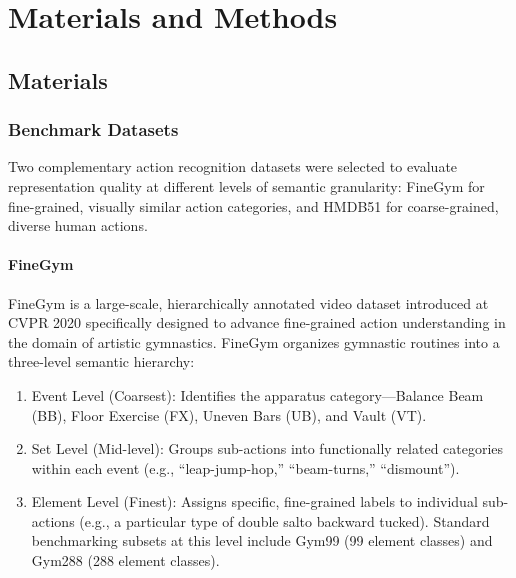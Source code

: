 \chapter{Materials and Methods}

\section{Materials}

\subsection{Benchmark Datasets}

Two complementary action recognition datasets were selected to evaluate representation quality at different levels of semantic granularity: FineGym for fine-grained, visually similar action categories, and HMDB51 for coarse-grained, diverse human actions.

\subsubsection{FineGym}

FineGym \citep{shao2020finegym} is a large-scale, hierarchically annotated video dataset introduced at CVPR 2020 specifically designed to advance fine-grained action understanding in the domain of artistic gymnastics. FineGym organizes gymnastic routines into a three-level semantic hierarchy:

\begin{enumerate}[leftmargin=*]
    \item Event Level (Coarsest): Identifies the apparatus category---Balance Beam (BB), Floor Exercise (FX), Uneven Bars (UB), and Vault (VT).
    \item Set Level (Mid-level): Groups sub-actions into functionally related categories within each event (e.g., ``leap-jump-hop,'' ``beam-turns,'' ``dismount'').
    \item Element Level (Finest): Assigns specific, fine-grained labels to individual sub-actions (e.g., a particular type of double salto backward tucked). Standard benchmarking subsets at this level include Gym99 (99 element classes) and Gym288 (288 element classes).
\end{enumerate}

